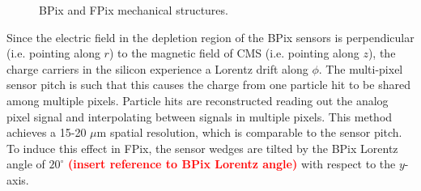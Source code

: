 \documentclass[dissertation.tex]{subfiles}
\begin{document}
\begin{figure}
	\caption{BPix and FPix mechanical structures.}
	\label{fig:pixel_mechanics}
\end{figure}

Since the electric field in the depletion region of the BPix sensors is perpendicular (i.e. pointing along $r$) to the magnetic field of CMS (i.e. pointing along $z$), the charge carriers in the silicon experience a Lorentz drift along $\phi$.  The multi-pixel sensor pitch is such that this causes the charge from one particle hit to be shared among multiple pixels.  Particle hits are reconstructed reading out the analog pixel signal and interpolating between signals in multiple pixels.  This method achieves a 15-20 $\mu\mbox{m}$ spatial resolution, which is comparable to the sensor pitch.  To induce this effect in FPix, the sensor wedges are tilted by the BPix Lorentz angle of $20^{\circ}$ \textcolor{red}{\textbf{(insert reference to BPix Lorentz angle)}} with respect to the $y$-axis.
\end{document}
